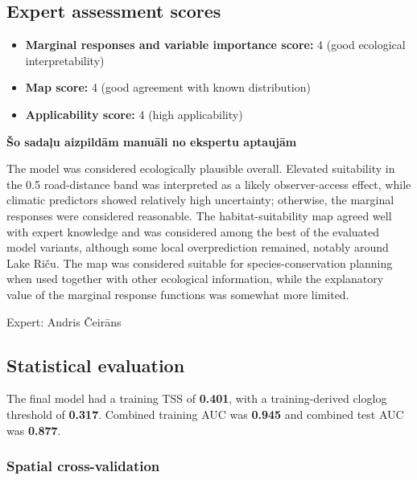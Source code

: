 \documentclass[
  openany]{book}
\providecommand{\tightlist}{%
  \setlength{\itemsep}{0pt}\setlength{\parskip}{0pt}}
\providecommand{\tightlist}{%
  \setlength{\itemsep}{0pt}%
  \setlength{\parskip}{0pt}%
}
\begin{document}
\subsection*{Expert assessment scores}\label{expert-assessment-scores-6}

\begin{itemize}
\tightlist
\item
  \textbf{Marginal responses and variable importance score:} 4 (good ecological interpretability)
\item
  \textbf{Map score:} 4 (good agreement with known distribution)
\item
  \textbf{Applicability score:} 4 (high applicability)
\end{itemize}

\textbf{Šo sadaļu aizpildām manuāli no ekspertu aptaujām}

The model was considered ecologically plausible overall. Elevated suitability in
the 0.5 road-distance band was interpreted as a likely observer-access effect,
while climatic predictors showed relatively high uncertainty; otherwise, the
marginal responses were considered reasonable. The habitat-suitability map agreed
well with expert knowledge and was considered among the best of the evaluated
model variants, although some local overprediction remained, notably around
Lake Riču. The map was considered suitable for species-conservation planning
when used together with other ecological information, while the explanatory
value of the marginal response functions was somewhat more limited.

Expert: Andris Čeirāns

\subsection*{Statistical evaluation}\label{statistical-evaluation-6}

The final model had a training TSS of \textbf{0.401}, with a training-derived cloglog threshold of \textbf{0.317}. Combined training AUC was \textbf{0.945} and combined test AUC was \textbf{0.877}.

\subsubsection*{Spatial cross-validation}\label{spatial-cross-validation-6}
\end{document}
